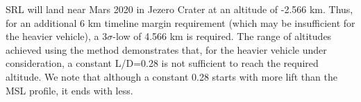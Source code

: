 SRL will land near Mars 2020 in Jezero Crater at an altitude of -2.566 km. Thus, for an additional 6 km timeline margin requirement (which may be insufficient for the heavier vehicle), a 3$\sigma$-low of 4.566 km is required. The range of altitudes achieved using the method demonstrates that, for the heavier vehicle under consideration, a constant L/D=0.28 is not sufficient to reach the required altitude. We note that although a constant 0.28 starts with more lift than the MSL profile, it ends with less.  



